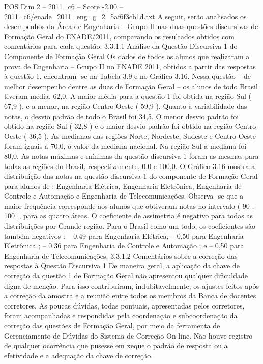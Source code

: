 \begin{textsample}{POS Dim 2 – 2011\_c6 – Score -2.00 – 2011\_c6/enade\_2011\_eng\_g\_2\_5af6f3cb1d.txt}
A seguir, serão analisados os desempenhos da Área de Engenharia – Grupo II nas duas questões discursivas de Formação Geral do ENADE/2011, comparando os resultados obtidos com comentários para cada questão. 3.3.1.1 Análise da Questão Discursiva 1 do Componente de Formação Geral Os dados de todos os alunos que realizaram a prova de Engenharia – Grupo II no ENADE 2011, obtidos a partir das respostas à questão 1, encontram -se na Tabela 3.9 e no Gráfico 3.16.
Nessa questão – de melhor desempenho dentre as duas de Formação Geral – os alunos de todo Brasil tiveram média, 62,0.
A maior média para a questão 1 foi obtida na região Sul ( 67,9 ), e a menor, na região Centro-Oeste ( 59,9 ).
Quanto à variabilidade das notas, o desvio padrão de todo o Brasil foi 34,5.
O menor desvio padrão foi obtido na região Sul ( 32,8 ) e o maior desvio padrão foi obtido na região Centro-Oeste ( 36,5 ).
As medianas das regiões Norte, Nordeste, Sudeste e Centro-Oeste foram iguais a 70,0, o valor da mediana nacional.
Na região Sul a mediana foi 80,0.
As notas máximas e mínimas da questão discursiva 1 foram as mesmas para todas as regiões do Brasil, respectivamente, 0,0 e 100,0.
O Gráfico 3.16 mostra a distribuição das notas na questão discursiva 1 do componente de Formação Geral para alunos de : Engenharia Elétrica, Engenharia Eletrônica, Engenharia de Controle e Automação e Engenharia de Telecomunicações.
Observa -se que a maior frequência corresponde aos alunos que obtiveram notas no intervalo ( 90 ; 100 ], para as quatro áreas.
O coeficiente de assimetria é negativo para todas as distribuições por Grande região.
Para o Brasil como um todo, os coeficientes são também negativos : – 0,49 para Engenharia Elétrica, – 0,50 para Engenharia Eletrônica ; – 0,36 para Engenharia de Controle e Automação ; e – 0,50 para Engenharia de Telecomunicações. 3.3.1.2 Comentários sobre a correção das respostas à Questão Discursiva 1 De maneira geral, a aplicação da chave de correção da questão 1 de Formação Geral não apresentou qualquer dificuldade digna de menção.
Para isso contribuíram, indubitavelmente, os ajustes feitos após a correção da amostra e a reunião entre todos os membros da Banca de docentes corretores.
As poucas dúvidas, todas pontuais, apresentadas pelos corretores, foram acompanhadas e respondidas pela coordenação e subcoordenação da correção das questões de Formação Geral, por meio da ferramenta de Gerenciamento de Dúvidas do Sistema de Correção On-line.
Não houve registro de qualquer ocorrência que pusesse em xeque o padrão de resposta ou a efetividade e a adequação da chave de correção.

\end{textsample}
